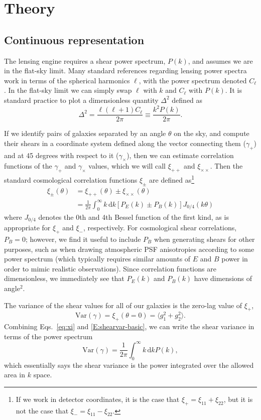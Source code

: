 \documentclass[preprint]{aastex}
\newcommand{\rmd}{\ensuremath{\mathrm{d}}}
\newcommand{\beq}{\begin{equation}}
\newcommand{\eeq}{\end{equation}}
\begin{document}
\section{Theory}\label{sect:theory}

\subsection{Continuous representation}

The lensing engine requires a shear power spectrum, $P(k)$, and
assumes we are in the flat-sky limit.  Many standard references
regarding lensing power spectra work in terms of the spherical
harmonics $\ell$, with the power spectrum denoted $C_\ell$.  In the
flat-sky limit we can simply swap $\ell$ with $k$ and $C_\ell$ with
$P(k)$.  It is standard practice to plot a dimensionless quantity
$\Delta^2$ defined as
\beq
\Delta^2 = \frac{\ell(\ell+1) C_{\ell}}{2\pi}\equiv \frac{k^2 P(k)}{2\pi}.
\eeq

If we identify pairs of galaxies separated by an angle $\theta$ on the
sky, and compute their shears in a coordinate
system defined along the vector connecting them ($\gamma_+$) and at 45
degrees with respect to it ($\gamma_\times$), then we can estimate 
correlation functions of the $\gamma_+$ and $\gamma_\times$ values,
which we will call $\xi_{++}$ and $\xi_{\times\times}$.  Then the
standard cosmological correlation functions $\xi_{\pm}$ are defined
as\footnote{If we work in detector coordinates, it is the
  case that $\xi_+ = \xi_{11}+\xi_{22}$, but it is not the case that
  $\xi_- = \xi_{11}-\xi_{22}$.}
\begin{align}
\xi_{\pm}(\theta) &=  \xi_{++}(\theta)\pm \xi_{\times \times}(\theta) \\
 &= \frac{1}{2\pi}\int_0^{\infty} k\,\rmd k [P_E(k)\pm P_B(k)] J_{0/4}(k\theta)  \label{eq:xi}
\end{align}
where $J_{0/4}$ denotes the 0th and 4th Bessel function of the first
kind, as is appropriate for $\xi_+$ and $\xi_-$, respectively.
For cosmological shear correlations, $P_B=0$; however, we find
it useful to include $P_B$ when generating shears for other purposes,
such as when drawing atmospheric PSF anisotropies according to some
power spectrum (which typically requires 
similar amounts of $E$ and $B$ power in order to mimic realistic observations).
Since correlation functions are dimensionless, we immediately see that
$P_E(k)$ and $P_B(k)$ have dimensions of angle$^2$.

The variance of the shear values for all of our galaxies is the zero-lag value of $\xi_+$, 
\beq\label{E:shearvar-basic}
\mathrm{Var}(\gamma) = \xi_{+}(\theta=0) = \langle g_1^2 + g_2^2\rangle.
\eeq
Combining Eqs.~\ref{eq:xi} and \ref{E:shearvar-basic}, we can write
the shear variance in terms of the power
spectrum
\beq\label{E:shearvar}
\mathrm{Var}(\gamma) = \frac{1}{2\pi}\int_0^{\infty} k\,\rmd k P(k),
\eeq
which essentially says the shear variance is the power integrated over
the allowed area in $k$ space.
\end{document}
